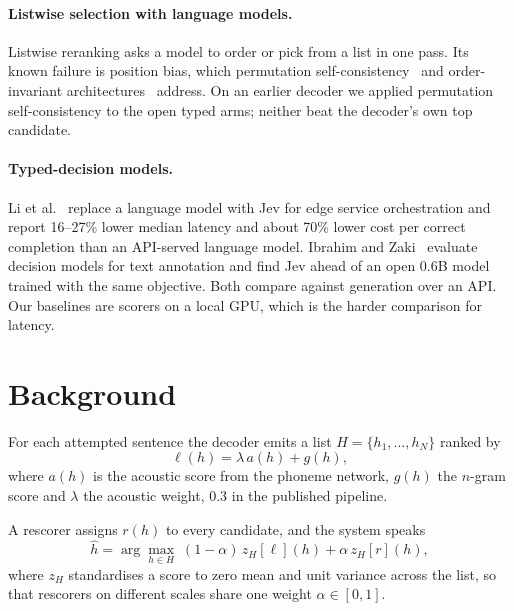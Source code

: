 \documentclass[11pt]{article}
\begin{document}
\paragraph{Listwise selection with language models.} Listwise reranking asks a model to
order or pick from a list in one pass. Its known failure is position bias, which
permutation self-consistency~\cite{tang2023psc} and order-invariant
architectures~\cite{bito2026invarirank} address. On an earlier decoder we applied
permutation self-consistency to the open typed arms; neither beat the decoder's own top
candidate.

\paragraph{Typed-decision models.} Li et al.~\cite{li2026edge} replace a language model
with Jev for edge service orchestration and report 16--27\% lower median latency and about
70\% lower cost per correct completion than an API-served language model. Ibrahim and
Zaki~\cite{ibrahim2026annotation} evaluate decision models for text annotation and find
Jev ahead of an open 0.6B model trained with the same objective. Both compare against
generation over an API. Our baselines are scorers on a local GPU, which is the harder
comparison for latency.

\section{Background}
\label{sec:background}

For each attempted sentence the decoder emits a list $H = \{h_1, \dots, h_N\}$ ranked by
\begin{equation}
  \ell(h) = \lambda\, a(h) + g(h),
\end{equation}
where $a(h)$ is the acoustic score from the phoneme network, $g(h)$ the $n$-gram score and
$\lambda$ the acoustic weight, 0.3 in the published pipeline.

A rescorer assigns $r(h)$ to every candidate, and the system speaks
\begin{equation}
  \hat h = \arg\max_{h \in H}\; (1-\alpha)\, z_H[\ell](h) + \alpha\, z_H[r](h),
\end{equation}
where $z_H$ standardises a score to zero mean and unit variance across the list, so that
rescorers on different scales share one weight $\alpha \in [0,1]$.
\end{document}
